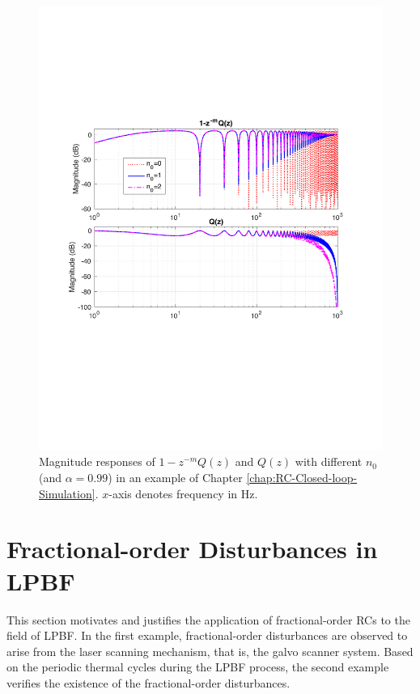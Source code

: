 \documentclass [11pt, proquest] {uwthesis}[2020/02/24]
\begin{document}
\begin{figure}[!ht]
\begin{centering}
\includegraphics[clip,width=12cm]{Closed-loop-simulation/n0_threevalues_99}
\par\end{centering}
\centering{}\caption{\label{fig:Magnitude-responses-of-2}Magnitude responses of $1-z^{-m}Q(z)$
and $Q(z)$ with different $n_{0}$ (and $\alpha=0.99$) in an example
of Chapter \ref{chap:RC-Closed-loop-Simulation}. $x$-axis denotes frequency in Hz.}
\end{figure}

\section{Fractional-order Disturbances in LPBF} \label{sec:Fractional-order-Disturbances}

This section motivates and justifies the application of fractional-order
RCs to the field of LPBF. In the first
example, fractional-order disturbances are observed to arise from
the laser scanning mechanism, that is, the galvo scanner system. Based on the periodic thermal cycles during the LPBF process, the second example verifies the existence of the fractional-order disturbances. 
\end{document}
